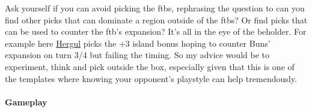 Ask yourself if you can avoid picking the ftbs, rephrasing the question to can you find other picks that can dominate a region outside of the ftbs? Or find picks that can be used to counter the ftb's expansion? It's all in the eye of the beholder. For example here \href{https://www.warzone.com/MultiPlayer?GameID=25233333}{Hergul} picks the +3 island bonus hoping to counter Buns' expansion on turn 3/4 but failing the timing. So my advice would be to experiment, think and pick outside the box, especially given that this is one of the templates where knowing your opponent's playstyle can help tremendously. 

\paragraph{Gameplay}

